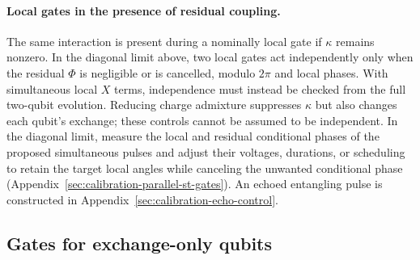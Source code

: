 \paragraph{Local gates in the presence of residual coupling.}
The same interaction is present during a nominally local gate if
$\kappa$ remains nonzero. In the diagonal limit above, two local
gates act independently only when the residual $\Phi$ is negligible
or is cancelled, modulo $2\pi$ and local phases. With simultaneous
local $X$ terms, independence must instead be checked from the full
two-qubit evolution. Reducing charge admixture suppresses $\kappa$
but also changes each qubit's exchange; these controls cannot be
assumed to be independent. In the diagonal limit, measure the local
and residual conditional phases of the proposed simultaneous pulses
and adjust their voltages, durations, or scheduling to retain the
target local angles while canceling the unwanted conditional phase
(Appendix~\ref{sec:calibration-parallel-st-gates}). An echoed
entangling pulse is constructed in
Appendix~\ref{sec:calibration-echo-control}.

\subsection{Gates for exchange-only qubits}
\label{sec:exchange-only-gates}
\label{sec:encoded-gates}

